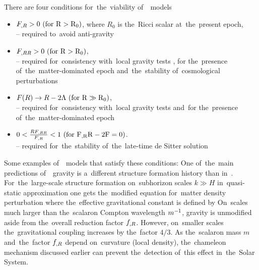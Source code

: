 {There are four conditions for~the~viability of~\fR\ models \parencite{Amendola_2007}
\begin{itemize}
	\item $F_{,R}>0\ (\rm{for\ } R>R_0)$, where $R_0$ is the~Ricci scalar at~the~present epoch,\\
	-- required to~avoid anti-gravity \parencite{2010deto.book.....A}\\
	\item $F_{,RR}>0\ (\rm{for\ } R>R_0)$,\\
	-- required for~consistency with~local gravity tests \parencite{2005gr.qc.....5136O}, for the~presence of~the~matter-dominated epoch \parencite{2007PhRvL..98m1302A} and~the~stability of~cosmological perturbations \parencite{2007PhRvD..75d4004S}\\
	\item $F(R)\rightarrow R-2\Lambda\ (\rm{for\ } R\gg R_0)$,\\
	-- required for~consistency with~local gravity tests \parencite{2008PhRvD..77b3507T} and~for the~presence of~the~matter-dominated epoch \parencite{Amendola_2007}\\
	\item $0<\frac{RF\RR}{F\R}<1\ (\rm{for\ } F\R R-2F=0)$.\\
	-- required for~the~stability of~the~late-time de Sitter solution \parencite{1988PhLB..202..198M}
\end{itemize}
Some examples of~\fR\ models that satisfy these conditions:
One of~the~main predictions of~\fR\ gravity is a~different structure formation history than in~\LCDM. For~the~large-scale structure formation on~subhorizon scales \mbox{$k\gg H$} in~quasi-static approximation one gets the~modified equation for~matter density perturbation \parencite{2011RSPTA.369.4947B}
where the~effective gravitational constant is defined by
On~scales much larger than the~scalaron Compton wavelength $m^{-1}$, gravity is unmodified aside from the~overall reduction factor $f_{,R}$. However, on~smaller scales the~gravitational coupling increases by the~factor $4/3$. As the~scalaron mass $m$ and~the~factor $f_{,R}$ depend on~curvature (local density), the~chameleon mechanism discussed earlier can prevent the~detection of~this effect in~the~Solar System.
} 
